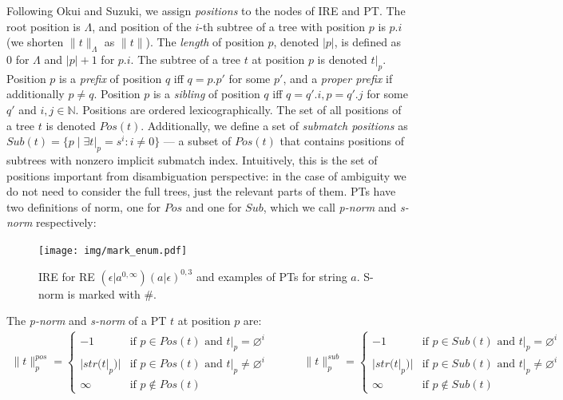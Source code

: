 \documentclass[AMA,STIX1COL]{WileyNJD-v2}
\newcommand{\XP}{\mathcal{P}}
\newcommand{\YN}{\mathbb{N}}
\newcommand{\pnorm}[2]{\|{#1}\|^{pos}_{#2}}
\newcommand{\snorm}[2]{\|{#1}\|^{sub}_{#2}}
\begin{document}
Following Okui and Suzuki, we assign \emph{positions} to the nodes of IRE and PT.
The root position is $\Lambda$, and position of the $i$-th subtree of a tree with position $p$ is $p.i$
(we shorten $\|t\|_\Lambda$ as $\|t\|$).
The \emph{length} of position $p$, denoted $|p|$, is defined as $0$ for $\Lambda$ and $|p| + 1$ for $p.i$.
The subtree of a tree $t$ at position $p$ is denoted $t|_p$.
Position $p$ is a \emph{prefix} of position $q$ iff $q = p.p'$ for some $p'$,
and a \emph{proper prefix} if additionally $p \neq q$.
Position $p$ is a \emph{sibling} of position $q$ iff $q = q'.i, p = q'.j$ for some $q'$ and $i,j \in \YN$.
Positions are ordered lexicographically.
The set of all positions of a tree $t$ is denoted $Pos(t)$.
Additionally, we define a set of \emph{submatch positions} as
$Sub(t) = \big\{ p \mid \exists t|_p = s^i : i \neq 0 \big\}$ ---
a subset of $Pos(t)$ that contains positions of subtrees with nonzero implicit submatch index.
Intuitively, this is the set of positions important from disambiguation perspective:
in the case of ambiguity we do not need to consider the full trees,
just the relevant parts of them.
%
PTs have two definitions of norm, one for $Pos$ and one for $Sub$,
which we call \emph{p-norm} and \emph{s-norm} respectively:

\begin{figure}
\texttt{[image: img/mark\_enum.pdf]}
\vspace{-2em}
\caption{
IRE for RE $(\epsilon|a^{0,\infty})(a|\epsilon)^{0,3}$
and examples of PTs for string $a$.
S-norm is marked with $\#$.
}\label{fig:mark_enum}
\end{figure}

    \begin{definition}\label{tnorm_of_PTs}
    The \emph{p-norm} and \emph{s-norm} of a PT $t$ at position $p$ are:
    \begin{align*}
        \pnorm{t}{p} =
            \begin{cases}
                -1          &\text{if } p \in Pos(t) \text{ and } t|_p = \varnothing^i  \\[-0.2em]
                |str(t|_p)| &\text{if } p \in Pos(t) \text{ and } t|_p \neq \varnothing^i \\[-0.2em]
                \infty      &\text{if } p \not\in Pos(t)
            \end{cases}
    \quad\quad\quad
        \snorm{t}{p} =
            \begin{cases}
                -1          &\text{if } p \in Sub(t) \text{ and } t|_p = \varnothing^i  \\[-0.2em]
                |str(t|_p)| &\text{if } p \in Sub(t) \text{ and } t|_p \neq \varnothing^i \\[-0.2em]
                \infty      &\text{if } p \not\in Sub(t)
            \end{cases}
    \end{align*}
    \end{definition}
\end{document}

